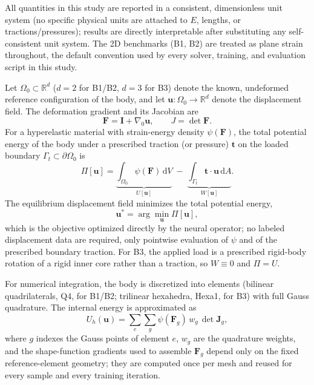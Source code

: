 \documentclass[final,5p,times]{elsarticle}
\begin{document}
All quantities in this study are reported in a consistent, dimensionless
unit system (no specific physical units are attached to $E$, lengths, or
tractions/pressures); results are directly interpretable after
substituting any self-consistent unit system. The 2D benchmarks (B1, B2)
are treated as plane strain throughout, the default convention used by
every solver, training, and evaluation script in this study.

Let $\Omega_0 \subset \mathbb{R}^d$ ($d=2$ for B1/B2, $d=3$ for B3) denote the
known, undeformed reference configuration of the body, and let
$\mathbf{u}:\Omega_0 \to \mathbb{R}^d$ denote the displacement field. The
deformation gradient and its Jacobian are
\begin{equation}
  \mathbf{F} = \mathbf{I} + \nabla_0 \mathbf{u}, \qquad J = \det \mathbf{F}.
\end{equation}
For a hyperelastic material with strain-energy density $\psi(\mathbf{F})$, the
total potential energy of the body under a prescribed traction (or pressure)
$\mathbf{t}$ on the loaded boundary $\Gamma_t \subset \partial\Omega_0$ is
\begin{equation}
  \Pi[\mathbf{u}] = \underbrace{\int_{\Omega_0} \psi(\mathbf{F})\,\mathrm{d}V}_{U[\mathbf{u}]}
  \;-\; \underbrace{\int_{\Gamma_t} \mathbf{t}\cdot\mathbf{u}\,\mathrm{d}A}_{W[\mathbf{u}]}.
  \label{eq:potential-energy}
\end{equation}
The equilibrium displacement field minimizes the total potential energy,
\begin{equation}
  \mathbf{u}^\ast = \arg\min_{\mathbf{u}} \Pi[\mathbf{u}],
  \label{eq:min-energy}
\end{equation}
which is the objective optimized directly by the neural operator; no
labeled displacement data are required, only pointwise evaluation of
$\psi$ and of the prescribed boundary traction. For B3, the applied load
is a prescribed rigid-body rotation of a rigid inner core rather than a
traction, so $W \equiv 0$ and $\Pi = U$.

For numerical integration, the body is discretized into elements (bilinear
quadrilaterals, Q4, for B1/B2; trilinear hexahedra, Hexa1, for B3) with full
Gauss quadrature. The internal energy is approximated as
\begin{equation}
  U_h(\mathbf{u}) = \sum_{e} \sum_{g} \psi(\mathbf{F}_g)\, w_g \, \det \mathbf{J}_g,
  \label{eq:discrete-energy}
\end{equation}
where $g$ indexes the Gauss points of element $e$, $w_g$ are the quadrature
weights, and the shape-function gradients used to assemble $\mathbf{F}_g$
depend only on the fixed reference-element geometry; they are computed once
per mesh and reused for every sample and every training iteration.
\end{document}
